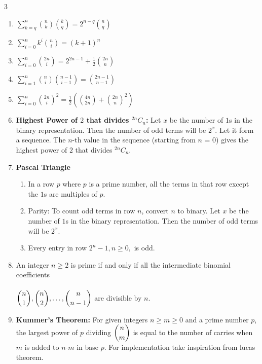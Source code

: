\documentclass[8pt,a4paper,onesided]{article}
\begin{document}
\begin{multicols}{3}
\begin{enumerate}
    \item $\displaystyle \sum \limits_{k=q}^n{n \choose k}{k \choose q}=2^{n-q}{n \choose q}$
    \item $\displaystyle \sum \limits_{i=0}^nk^i{n \choose i}=(k+1)^n$
    \item $\displaystyle \sum \limits_{i=0}^n{2n \choose i}=2^{2n-1}+\frac{1}{2}{2n \choose n}$
    \item $\displaystyle \sum \limits_{i=1}^n{n \choose i}{n-1 \choose i-1}={2n-1 \choose n-1}$
    \item $\displaystyle \sum \limits_{i=0}^n{2n \choose i}^2=\frac{1}{2} \left( {4n \choose 2n}+{2n \choose n}^2 \right)$
    \item \textbf{Highest Power of $\displaystyle 2$ that divides $^{2n}C_n$:}
    Let $\displaystyle x$ be the number of $\displaystyle 1$s in the binary representation. Then the number of odd terms will be $\displaystyle 2^x$. Let it form a sequence. The $n$-th value in the sequence (starting from $n$ = 0) gives the highest power of $\displaystyle 2$ that divides $^{2n}C_n$.
    \item \textbf{Pascal Triangle}
    \begin{enumerate}
        \item In a row $\displaystyle p$ where $\displaystyle p$ is a prime number, all the terms in that row except the $\displaystyle 1$s are multiples of $\displaystyle p$.
        \item Parity: To count odd terms in row $n$, convert $n$ to binary. Let $\displaystyle x$ be the number of $\displaystyle 1$s in the binary representation. Then the number of odd terms will be $\displaystyle 2^x$.
        \item Every entry in row $\displaystyle 2^n-1, n\geq 0,$ is odd.
    \end{enumerate}
    \item An integer $n\geq 2$ is prime if and only if all the intermediate binomial coefficients \\ \\  $\displaystyle \displaystyle {n \choose 1},{n \choose 2},\dots, {n \choose n-1}$ are divisible by $n$.
    \item \textbf{Kummer’s Theorem:} For given integers $n\geq m\geq 0$ and a prime number $\displaystyle p$, the largest power of $\displaystyle p$ dividing $\displaystyle \displaystyle {n \choose m}$ is equal to the number of carries when $m$ is added to $n$-$m$ in base $\displaystyle p$. For implementation take inspiration from lucas theorem.

\end{enumerate}
\end{multicols}
\end{document}
